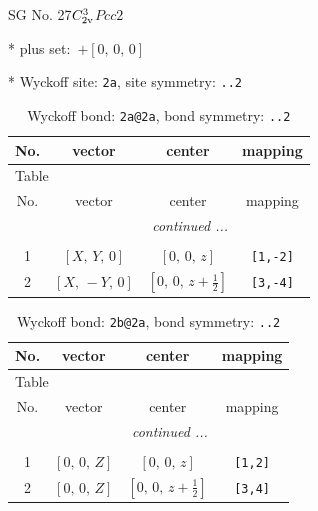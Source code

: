 \documentclass[fleqn,8pt]{jsarticle}
\begin{document}
\setcounter{MaxMatrixCols}{32}

\renewcommand{\tablename}{Table~}
\renewcommand{\figurename}{Figure~}
\begin{center}
\LARGE
SG No. 27\quad$C_{\rm 2v}^{3}$\quad$Pcc2$\quad[ orthorhombic ]
\end{center}

* plus set:\,\,\,$+\left[ 0,\, 0,\, 0 \right]$


* Wyckoff site: {\tt 2a}, site symmetry: {\tt ..2}
\renewcommand{\arraystretch}{1.2}
\begin{longtable}{cccc}
\caption{Wyckoff bond: {\tt 2a@2a}, bond symmetry: {\tt ..2}}
 \\
 \hline \hline
No. & vector & center & mapping \\ \hline \endfirsthead

\multicolumn{3}{l}{\tablename\ \thetable{}} \\
 \hline \hline
No. & vector & center & mapping \\ \hline \endhead

 \hline \hline
\multicolumn{3}{r}{\footnotesize\it continued ...} \\ \endfoot

 \hline \hline
\multicolumn{3}{r}{} \\ \endlastfoot

1 & $\left[ X,\, Y,\, 0 \right]$ & $\left[ 0,\, 0,\, z \right]$ & {\tt [1,-2]} \\ \hline
2 & $\left[ X,\, - Y,\, 0 \right]$ & $\left[ 0,\, 0,\, z + \frac{1}{2} \right]$ & {\tt [3,-4]} \\
\end{longtable}
\renewcommand{\arraystretch}{1.2}
\begin{longtable}{cccc}
\caption{Wyckoff bond: {\tt 2b@2a}, bond symmetry: {\tt ..2}}
 \\
 \hline \hline
No. & vector & center & mapping \\ \hline \endfirsthead

\multicolumn{3}{l}{\tablename\ \thetable{}} \\
 \hline \hline
No. & vector & center & mapping \\ \hline \endhead

 \hline \hline
\multicolumn{3}{r}{\footnotesize\it continued ...} \\ \endfoot

 \hline \hline
\multicolumn{3}{r}{} \\ \endlastfoot

1 & $\left[ 0,\, 0,\, Z \right]$ & $\left[ 0,\, 0,\, z \right]$ & {\tt [1,2]} \\ \hline
2 & $\left[ 0,\, 0,\, Z \right]$ & $\left[ 0,\, 0,\, z + \frac{1}{2} \right]$ & {\tt [3,4]} \\
\end{longtable}
\end{document}
